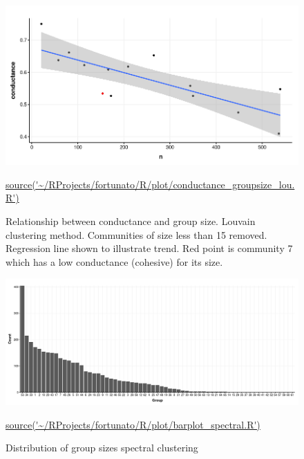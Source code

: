 \begin{figure}
    \centering
    \includegraphics[width=\textwidth]{images/chapter_community_detection/ggplot2/conductance/Rplot_louvain_conductancetheme.png}
    \caption{Relationship between conductance and group size. Louvain clustering method. Communities of size less than 15 removed. Regression line shown to illustrate trend. Red point is community 7 which has a low conductance (cohesive) for its size. }
    \tiny\url{source('~/RProjects/fortunato/R/plot/conductance_groupsize_lou.R')}
    \label{fig:conductance cdmlouvain}
\end{figure}




\begin{figure}
    \centering
    \includegraphics[width=\textwidth]{images/chapter_community_detection/ggplot2/group_size/Rplot_barplot_spectral_add_theme.png}
    \caption{Distribution of group sizes spectral clustering}
    \tiny\url{source('~/RProjects/fortunato/R/plot/barplot_spectral.R')}
    \label{fig:group sizes spectral clustering shows power law distribution}
\end{figure}



